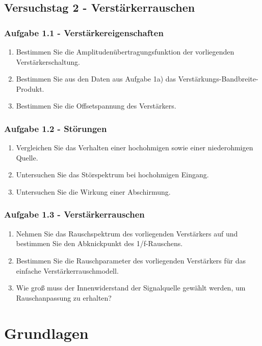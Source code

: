 \documentclass{article}						%
\begin{document}
	\subsection*{Versuchstag 2 - Verstärkerrauschen}
		\subsubsection*{Aufgabe 1.1 - Verstärkereigenschaften}
			\begin{enumerate}
				\item Bestimmen Sie die Amplitudenübertragungsfunktion der vorliegenden
Verstärkerschaltung.
				\item Bestimmen Sie aus den Daten aus Aufgabe 1a) das Verstärkungs-Bandbreite-
Produkt. 
				\item Bestimmen Sie die Offsetspannung des Verstärkers.
			\end{enumerate}	
		\subsubsection*{Aufgabe 1.2 - Störungen}
			\begin{enumerate}
				\item Vergleichen Sie das Verhalten einer hochohmigen sowie einer niederohmigen
Quelle.
				\item Untersuchen Sie das Störspektrum bei hochohmigen Eingang.
				\item Untersuchen Sie die Wirkung einer Abschirmung.
			\end{enumerate}
		\subsubsection*{Aufgabe 1.3 - Verstärkerrauschen}
			\begin{enumerate}
				\item Nehmen Sie das Rauschspektrum des vorliegenden Verstärkers auf und
bestimmen Sie den Abknickpunkt des 1/f-Rauschens.
				\item Bestimmen Sie die Rauschparameter des vorliegenden Verstärkers für das
einfache Verstärkerrauschmodell.
				\item Wie groß muss der Innenwiderstand der Signalquelle gewählt werden, um Rauschanpassung zu erhalten?
			\end{enumerate}				
\clearpage

\section{Grundlagen}
\end{document}
